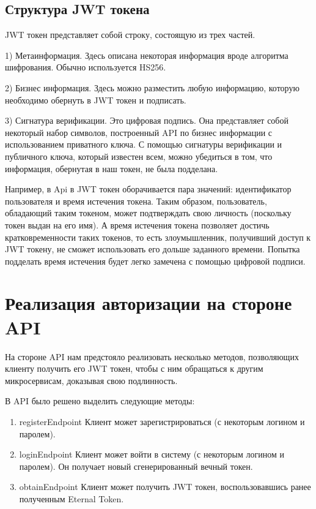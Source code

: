 \documentclass[14pt]{extarticle}
\begin{document}
    \subsection{Структура JWT токена}

    JWT токен представляет собой строку, состоящую из трех частей.

    1) Метаинформация.
    Здесь описана некоторая информация вроде алгоритма шифрования.
    Обычно используется HS256.

    2) Бизнес информация.
    Здесь можно разместить любую информацию, которую необходимо обернуть в JWT токен и подписать.

    3) Сигнатура верификации.
    Это цифровая подпись. Она представляет собой некоторый набор символов, построенный API по бизнес
    информации с использованием приватного ключа. С помощью сигнатуры верификации и публичного ключа, который
    известен всем, можно убедиться в том, что информация, обернутая в наш токен, не была подделана.

    Например, в Api в JWT токен оборачивается пара значений: идентификатор пользователя и время истечения токена.
    Таким образом,
    пользователь, обладающий таким токеном, может подтверждать свою личность
    (поскольку токен выдан на его имя). А время истечения токена позволяет достичь кратковременности таких
    токенов, то есть злоумышленник, получивший доступ к JWT токену, не сможет использовать его дольше заданного
    времени.
    Попытка подделать время истечения будет легко замечена с помощью цифровой подписи.

    \section{Реализация авторизации на стороне API}

    На стороне API нам предстояло реализовать несколько методов, позволяющих клиенту получить его JWT токен,
    чтобы с ним обращаться к другим микросервисам, доказывая свою подлинность.

    В API было решено выделить следующие методы:
    \begin{enumerate}
        \item registerEndpoint
            Клиент может зарегистрироваться (с некоторым логином и паролем).
        \item loginEndpoint
            Клиент может войти в систему (с некоторым логином и паролем).
            Он получает новый сгенерированный вечный токен.
        \item obtainEndpoint
        Клиент может получить JWT токен, воспользовавшись ранее полученным Eternal Token.
    \end{enumerate}
\end{document}

